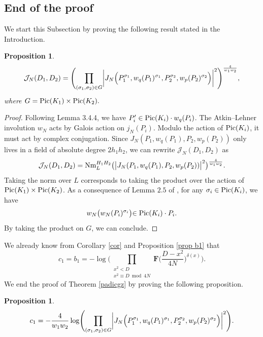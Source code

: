 \documentclass[a4paper,12pt]{article}
\newtheorem{proposition}[theorem]{Proposition}
\begin{document}
\subsection{End of the proof}
We start this Subsection by proving the following result stated in the Introduction.
\begin{proposition}\label{rewriting J_n}
    \begin{equation}
\mathcal{J}_N(D_1,D_2)
=\Biggl(\prod_{\substack{(\sigma_1,\sigma_2)\in G}}
\biggl|J_N\Bigl(P_1^{\sigma_1},w_q(P_1)^{\sigma_1},P_2^{\sigma_2},w_p(P_2)^{\sigma_2}\Bigl)\biggl|^2\Biggl)^{\frac{4}{w_1w_2}},
\end{equation}
where $G=\textup{Pic}(K_1)\times\textup{Pic}(K_2). $
\end{proposition}
\begin{proof}
    Following \cite{Daas} Lemma 3.4.4, we have $P_i'\in \textup{Pic}(K_i)\cdot w_q(P_i)$. The Atkin--Lehner involution $w_N$ acts by Galois action on $j_N(P_i)$. Modulo the action of $ \textup{Pic}(K_i)$, it must act by complex conjugation. Since $J_N(P_1,w_q(P_1),P_2,w_p(P_2))$ only lives in a field of absolute degree $2h_1h_2$, we can rewrite $\mathcal{J}_N(D_1,D_2)$ as
\begin{equation}   
\mathcal{J}_N(D_1,D_2)=\textup{Nm}_L^{H_1H_2}\bigl(\bigl|J_N(P_1,w_q(P_1),P_2,w_p(P_2))\bigl|^2\bigl)^{\frac{4}{w_1w_2}}.
\end{equation}
Taking the norm over $L$ corresponds to taking the product over the action of $\textup{Pic}(K_1)\times\textup{Pic}(K_2)$. As a consequence of Lemma $2.5$ of \cite{BertoliniDarmon1996}, for any $\sigma_i\in\textup{Pic}(K_i)$, we have 
\[w_N\bigl(w_N(P_i)^{\sigma_i}\bigl)\in\textup{Pic}(K_i)\cdot P_i.\]
By taking the product on $G$, we can conclude.
\end{proof}
We already know from Corollary \ref{cor} and Proposition \ref{prop b1} that
\begin{equation}
c_1=b_1=-\log\Biggl(\prod_{\substack{x^2<D\\x^2\equiv D \bmod{4N}}}\mathbf{F}\biggl(\frac{D-x^2}{4N}\biggl)^{\delta(x)}\Biggl).
\end{equation}
We end the proof of Theorem \ref{padicgz} by proving the following proposition.
\begin{proposition}\label{valeur c1}
\begin{equation}
c_1=-\frac{4}{w_1w_2}\log\Biggl(\prod_{\substack{(\sigma_1,\sigma_2)\in G}}
\biggl|J_N\Bigl(P_1^{\sigma_1},w_q(P_1)^{\sigma_1},P_2^{\sigma_2},w_p(P_2)^{\sigma_2}\Bigl)\biggl|^2\Biggl).
\end{equation}
\end{proposition}
\end{document}
